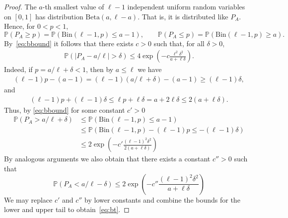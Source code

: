 \documentclass[english,11pt]{smfart}
\newcommand{\Prb}[1]{\mathbb{P}\left(#1\right)}
\numberwithin{equation}{section}
\begin{document}
\begin{proof}
	The $a$-th smallest value of $\ell - 1$ independent uniform random variables on $[0,1]$ has distribution $\mathrm{Beta}(a, \ell - a)$. That is, it is distributed like $P_A$. Hence, for $0<p<1$,
	\[
		\Prb{P_A \ge p} = \Prb{\mathrm{Bin}(\ell - 1, p) \le a-1}, \qquad \Prb{P_A \le p} = \Prb{\mathrm{Bin}(\ell - 1, p) \ge a}.
	\]
	By~\eqref{eq:bbound} it follows that there exists $c > 0$ such that, for all $\delta>0$,
	\begin{align}
		\label{eq:bt}
		\Prb{|P_A-a/\ell| > \delta} \le 4 \exp\left(-c\frac{\ell^2 \delta^2}{a + \ell\delta}\right).
	\end{align}
	Indeed, if $p = a/\ell + \delta < 1$, then by $a \le \ell$ we have
	\begin{align*}
		(\ell - 1)p - (a-1) = (\ell - 1)(a/\ell + \delta) - (a-1) \ge (\ell - 1)\delta,
	\end{align*}
	and
	\begin{align*}
		(\ell-1)p + (\ell-1)\delta \le \ell p + \ell \delta = a + 2\ell \delta \le 2(a + \ell \delta).
	\end{align*}
	Thus, by \eqref{eq:bbound} for some constant $c'>0$
	\begin{align*}
		\Prb{P_A > a/\ell + \delta} 	&\le \Prb{\mathrm{Bin}(\ell - 1, p) \le a-1} \\
									&\le \Prb{ \mathrm{Bin}(\ell - 1, p) - (\ell -1)p \le -(\ell-1) \delta} \\
									&\le  2\exp\left(-c'\frac{(\ell- 1)^2 \delta^2}{2(a + \ell\delta)}\right)
	\end{align*}
	By analogous arguments we also obtain that there exists a constant $c''>0$ such that
	\[
		\Prb{P_A < a/\ell - \delta} \le 2 \exp\left(-c'' \frac{(\ell- 1)^2 \delta^2}{a + \ell\delta}\right)
	\]
	We may replace $c'$ and $c''$ by lower constants and combine the bounds for the lower and upper tail to obtain~\eqref{eq:bt}.
	\smallskip
    

\end{proof}
\end{document}
